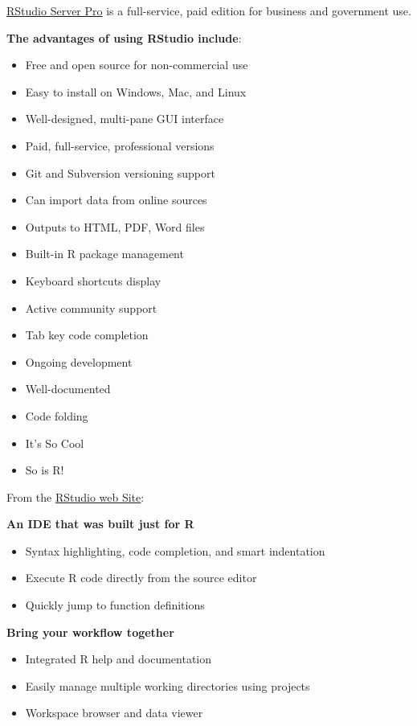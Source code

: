 \documentclass[]{book}
\providecommand{\tightlist}{%
  \setlength{\itemsep}{0pt}\setlength{\parskip}{0pt}}
\theoremstyle{definition}
\theoremstyle{definition}
\theoremstyle{definition}
\theoremstyle{remark}
\begin{document}
\href{https://www.rstudio.com/products/rstudio-server-pro/}{RStudio
Server Pro} is a full-service, paid edition for business and government
use.

\textbf{The advantages of using RStudio include}:

\begin{itemize}
\tightlist
\item
  Free and open source for non-commercial use
\item
  Easy to install on Windows, Mac, and Linux
\item
  Well-designed, multi-pane GUI interface
\item
  Paid, full-service, professional versions
\item
  Git and Subversion versioning support
\item
  Can import data from online sources
\item
  Outputs to HTML, PDF, Word files
\item
  Built-in R package management
\item
  Keyboard shortcuts display
\item
  Active community support
\item
  Tab key code completion
\item
  Ongoing development
\item
  Well-documented
\item
  Code folding
\item
  It's So Cool
\item
  So is R!
\end{itemize}

From the
\href{https://www.rstudio.com/products/rstudio/features/}{RStudio web
Site}:

\textbf{An IDE that was built just for R}

\begin{itemize}
\tightlist
\item
  Syntax highlighting, code completion, and smart indentation
\item
  Execute R code directly from the source editor
\item
  Quickly jump to function definitions
\end{itemize}

\textbf{Bring your workflow together}

\begin{itemize}
\tightlist
\item
  Integrated R help and documentation
\item
  Easily manage multiple working directories using projects
\item
  Workspace browser and data viewer
\end{itemize}
\end{document}
